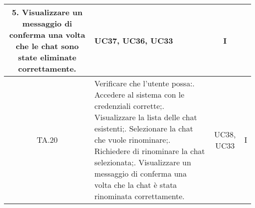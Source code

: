{{{{{{{{\begin{xltabular}{\textwidth}{|c|X|c|c|}
    5. Visualizzare un messaggio di conferma una volta che le chat sono state eliminate correttamente. & UC37, UC36, UC33 & I \\
    \hline
    TA.20 & Verificare che l'utente possa:. Accedere al sistema con le credenziali corrette;. Visualizzare la lista delle chat esistenti;. Selezionare la chat che vuole rinominare;. Richiedere di rinominare la chat selezionata;. Visualizzare un messaggio di conferma una volta che la chat è stata rinominata correttamente. & UC38, UC33 & I \\
    \hline
    \end{xltabular}
    
    
    
    
    
}}}}}}}}

